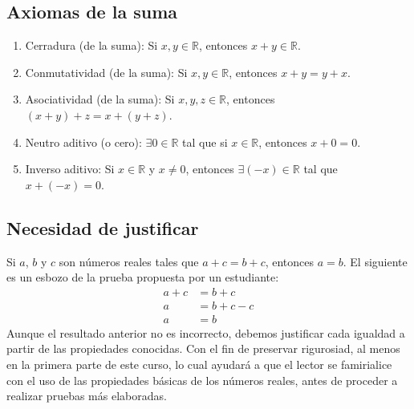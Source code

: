 \documentclass[11pt]{article}
\newcommand{\R}{\mathbb{R}}
\begin{document}
\subsection*{Axiomas de la suma}
\begin{enumerate}[label=S\arabic*., start=0]
    \item Cerradura (de la suma): Si $x,y\in \R$, entonces $x+y \in \R$.

    \item Conmutatividad (de la suma): Si $x, y\in \R$, entonces $x+y =y+x$.

    \item Asociatividad (de la suma): Si $x, y, z\in \R$, entonces $(x+y)+z = x+(y+z)$.
    \item Neutro aditivo (o cero): $\exists 0\in \R$ tal que si $x\in \R$, entonces $x+0=0$.
    \item Inverso aditivo: Si $x\in \R$ y $x\neq 0$, entonces $\exists (-x)\in \R$ tal que $x+(-x)=0$.
\end{enumerate}

\subsection*{Necesidad de justificar}

Si $a$, $b$ y $c$ son números reales tales que $a+c=b+c$, entonces $a=b$. El siguiente es un esbozo de la prueba propuesta por un estudiante: \begin{align*}
    a+c &= b+c\\
    a &= b+c-c\\
    a &= b \end{align*}
Aunque el resultado anterior no es incorrecto, debemos justificar cada igualdad a partir de las propiedades conocidas. Con el fin de preservar rigurosiad, al menos en la primera parte de este curso, lo cual ayudará a que el lector se famirialice con el uso de las propiedades básicas de los números reales, antes de proceder a realizar pruebas más elaboradas.
\end{document}
